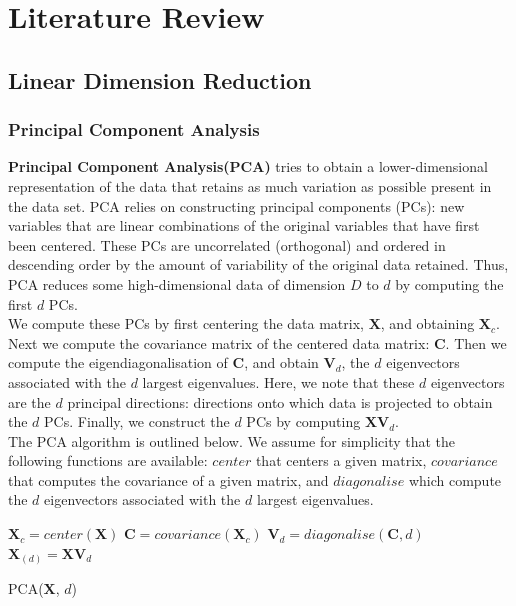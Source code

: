 \documentclass[12pt]{report}
\begin{document}
\chapter{Literature Review}

\section{Linear Dimension Reduction}

\subsection{Principal Component Analysis}

\textbf{Principal Component Analysis(PCA)} tries to obtain a 
lower-dimensional representation of the data 
that retains as much variation as possible present in the data set. 
PCA relies on constructing principal components (PCs): 
new variables that are linear combinations of the original variables 
that have first been centered.
These PCs are uncorrelated (orthogonal) and ordered in descending order 
by the amount of variability of the original data retained.
Thus, PCA reduces some high-dimensional data of dimension $D$ 
to $d$ by computing the first $d$ PCs.\\
We compute these PCs by first centering the data matrix, $\mathbf{X}$, and
obtaining $\mathbf{X}_c$. Next we compute the covariance matrix of 
the centered data matrix: $\mathbf{C}$.
Then we compute the eigendiagonalisation of $\mathbf{C}$,
and obtain $\mathbf{V}_d$, the $d$ eigenvectors associated 
with the $d$ largest eigenvalues. Here, we note that these $d$ eigenvectors
are the $d$ principal directions: directions onto which data is projected to
obtain the $d$ PCs.
Finally, we construct the $d$ PCs by computing $\mathbf{X}\mathbf{V}_d$.
\\
The PCA algorithm is outlined below. We assume for simplicity that the 
following functions are available:
$center$ that centers a given matrix, $covariance$ that computes the covariance
of a given matrix, and $diagonalise$ which compute the $d$ 
eigenvectors associated with the $d$ largest eigenvalues.
\begin{algorithm}
    $\mathbf{X}_c = center(\mathbf{X})$\;
    $\mathbf{C} = covariance(\mathbf{X}_c)$\;
    $\mathbf{V}_d = diagonalise(\mathbf{C}, d)$\;
    $\mathbf{X}_{(d)} = \mathbf{X}\mathbf{V}_{d}$\;
    \caption{PCA($\mathbf{X}$, $d$)}
\end{algorithm}
\end{document}

